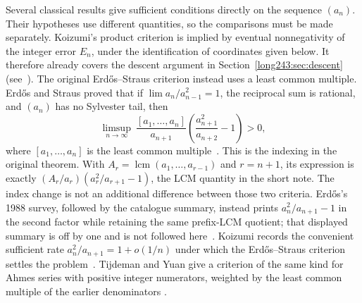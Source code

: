 Several classical results give sufficient conditions directly on the
sequence $(a_n)$. Their hypotheses use different quantities, so the
comparisons must be made separately. Koizumi's product criterion is
implied by eventual nonnegativity of the integer error $E_n$, under the
identification of coordinates given below. It therefore already covers
the descent argument in Section~\ref{long243:sec:descent}
(see~\cite[Cor.~4(1) and Prop.~1(1), pp.~14--15]{koizumi2025}).
The original Erd\H{o}s--Straus criterion instead uses a least common multiple.
Erd\H{o}s and Straus proved that if $\lim a_n/a_{n-1}^{2}=1$, the reciprocal
sum is rational, and $(a_n)$ has no Sylvester tail, then
\[
 \limsup_{n\to\infty}\ \frac{[a_1,\ldots,a_n]}{a_{n+1}}
 \left(\frac{a_{n+1}^{2}}{a_{n+2}}-1\right)>0,
\]
where $[a_1,\ldots,a_n]$ is the least common
multiple~\cite[Theorem~3, p.~132]{erdosstraus1964}.  This is the indexing in
the original theorem. With $A_r=\operatorname{lcm}(a_1,\ldots,a_{r-1})$
and $r=n+1$, its expression is exactly
$(A_r/a_r)(a_r^2/a_{r+1}-1)$, the LCM quantity in the short note.
The index change is not an additional difference between those two
criteria. Erd\H{o}s's 1988 survey, followed by the
catalogue summary, instead prints $a_n^2/a_{n+1}-1$ in the second factor while
retaining the same prefix-LCM quotient; that displayed summary is off by one
and is not followed here~\cite[p.~105]{erdos1988}\cite{erdosproblems}.
Koizumi records the convenient sufficient rate
$a_n^2/a_{n+1}=1+o(1/n)$ under which the Erd\H{o}s--Straus criterion settles
the problem~\cite[Remark~3, p.~16]{koizumi2025}.  Tijdeman and Yuan give a
criterion of the same kind for Ahmes series with positive integer numerators,
weighted by the least common multiple of the earlier denominators
\cite{tijdemanyuan2002}.

